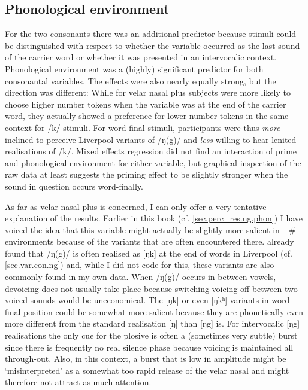 		\subsection{Phonological environment}

For the two consonants there was an additional predictor because stimuli could be distinguished with respect to whether the variable occurred as the last sound of the carrier word or whether it was presented in an intervocalic context.
Phonological environment was a (highly) significant predictor for both consonantal variables.
The effects were also nearly equally strong, but the direction was different: While for velar nasal plus subjects were more likely to choose higher number tokens when the variable was at the end of the carrier word, they actually showed a preference for lower number tokens in the same context for /k/ stimuli.
For word-final stimuli, participants were thus \emph{more} inclined to perceive Liverpool variants of /ŋ(g)/ and \emph{less} willing to hear lenited realisations of /k/.
Mixed effects regression did not find an interaction of prime and phonological environment for either variable, but graphical inspection of the raw data at least suggests the priming effect to be slightly stronger when the sound in question occurs word-finally.

As far as velar nasal plus is concerned, I can only offer a very tentative explanation of the results.
Earlier in this book (cf. \ref{sec.perc_res.ng.phon}) I have voiced the idea that this variable might actually be slightly more salient in \_\# environments because of the variants that are often encountered there.
\textcite{knowles1973} already found that /ŋ(g)/ is often realised as [ŋk] at the end of words in Liverpool (cf. \ref{sec.var.con.ng}) and, while I did not code for this, these variants are also commonly found in my own data.
When /ŋ(g)/ occurs in-between vowels, devoicing does not usually take place because switching voicing off between two voiced sounds would be uneconomical.
The [ŋk] or even [ŋkʰ] variants in word-final position could be somewhat more salient because they are phonetically even more different from the standard realisation [ŋ] than [ŋg] is.
For intervocalic [ŋg] realisations the only cue for the plosive is often a (sometimes very subtle) burst since there is frequently no real silence phase because voicing is maintained all through-out.
Also, in this context, a burst that is low in amplitude might be `misinterpreted' as a somewhat too rapid release of the velar nasal and might therefore not attract as much attention.

